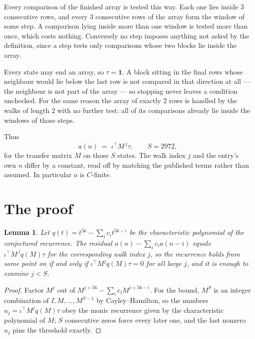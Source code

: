 \documentclass[11pt,a4paper]{article}
\theoremstyle{plain}
\newtheorem{lemma}[theorem]{Lemma}
\theoremstyle{definition}
\begin{document}
Every comparison of the finished array is tested this way. Each one lies inside $3$
consecutive rows, and every $3$ consecutive rows of the array form the window of some
step. A comparison lying inside more than one window is tested more than once, which costs
nothing. Conversely no step imposes anything not asked by the definition, since a step tests
only comparisons whose two blocks lie inside the array.

Every state may end an array, so $\tau=\mathbf{1}$. A block sitting in the final rows whose
neighbour would lie below the last row is not compared in that direction at all --- the
neighbour is not part of the array --- so stopping never leaves a condition unchecked. For the
same reason the array of exactly $2$ rows is handled by the walks of length $2$ with no
further test: all of its comparisons already lie inside the windows of those steps.

Thus
\[
a(n)\;=\;\iota^{\!\top}M^{\,j}\tau ,\qquad S=2972,
\]
for the transfer matrix $M$ on those $S$ states. The walk index $j$ and the entry's own $n$
differ by a constant, read off by matching the published terms rather than assumed. In
particular $a$ is $C$-finite.

\section{The proof}

\begin{lemma}\label{lem:crit}
Let $q(t)=t^{56}-\sum_i c_it^{56-i}$ be the characteristic polynomial of the
conjectured recurrence. The residual $a(n)-\sum_ic_ia(n-i)$ equals
$\iota^{\!\top}M^{\,j}q(M)\tau$ for the corresponding walk index $j$, so the recurrence
holds from some point on if and only if $\iota^{\!\top}M^{j}q(M)\tau=0$ for all large $j$,
and it is enough to examine $j<S$.
\end{lemma}

\begin{proof}
Factor $M^{j}$ out of $M^{j+56}-\sum_ic_iM^{j+56-i}$. For the bound, $M^{S}$
is an integer combination of $I,M,\dots,M^{S-1}$ by Cayley--Hamilton, so the numbers
$u_j=\iota^{\!\top}M^{j}q(M)\tau$ obey the monic recurrence given by the characteristic
polynomial of $M$; $S$ consecutive zeros force every later one, and the last nonzero $u_j$
pins the threshold exactly.
\end{proof}
\end{document}
